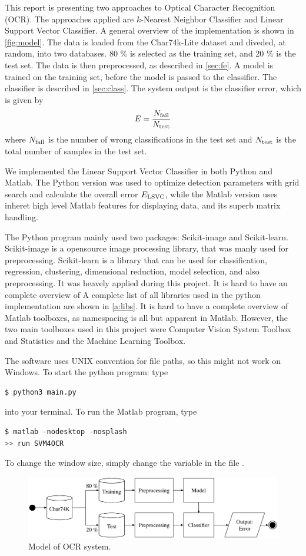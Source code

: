 \documentclass[../main.tex]{subfiles}
\begin{document}
This report is presenting two approaches to Optical Character Recognition (OCR). The approaches applied are $k$-Nearest Neighbor Classifier and Linear Support Vector Classifier. A general overview of the implementation is shown in \autoref{fig:model}. The data is loaded from the Char74k-Lite dataset and diveded, at random, into two databases. 80 \% is selected as the training set, and 20 \% is the test set. The data is then preprocessed, as described in \autoref{sec:fe}. A model is trained on the training set, before the model is passed to the classifier. The classifier is described in \autoref{sec:class}. The system output is the classifier error, which is given by
\begin{equation}
	E = \frac{N_{\rm fail}}{N_{\rm test}} \label{eq:error}
\end{equation}
where $N_{\rm fail}$ is the number of wrong classifications in the test set and $N_{\rm test}$ is the total number of samples in the test set. 

We implemented the Linear Support Vector Classifier in both Python and Matlab. The Python version was used to optimize detection parameters with grid search and calculate the overall error $E_{\rm LSVC}$, while the Matlab version uses inheret high level Matlab features for displaying data, and its superb matrix handling.

The Python program mainly used two packages: Scikit-image and Scikit-learn. Scikit-image is a opensource image processing library, that was manly used for preprocessing. Scikit-learn is a library that can be used for classification, regression, clustering, dimensional reduction, model selection, and also preprocessing. It was heavely applied during this project. It is hard to have an complete overview of A complete list of all libraries used in the python implementation are shown in \autoref{a:libs}. It is hard to have a complete overview of Matlab toolboxes, as namespacing is all but apparent in Matlab. However, the two main toolboxes used in this project were Computer Vision System Toolbox and Statistics and the Machine Learning Toolbox.

The software uses UNIX convention for file paths, so this might not work on Windows. To start the python program: type
\begin{lstlisting}[language=Python]
$ python3 main.py
\end{lstlisting}
into your terminal. To run the Matlab program, type
\begin{lstlisting}[language=Python]
$ matlab -nodesktop -nosplash
>> run SVM4OCR
\end{lstlisting}
To change the window size, simply change the variable  in the file .
\begin{figure}
  \centering
  \includegraphics[width=\textwidth]{figures/model.eps}
  \caption{Model of OCR system.} 
  \label{fig:model}
\end{figure}
\end{document}
